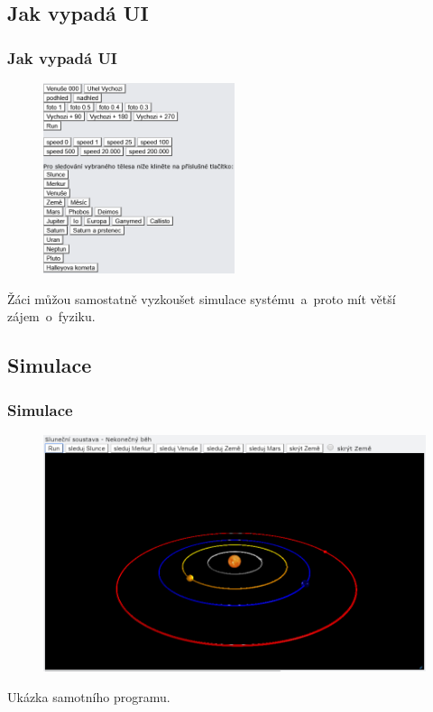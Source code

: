 \documentclass[hyperref={unicode}]{beamer}
\begin{document}
\subsection{Jak vypadá UI}
\begin{frame}
    \frametitle{Jak vypadá UI}
    \begin{figure}
        \centering
        \includegraphics[width=0.5\textwidth]{img4.png}
    \end{figure}
    
    Žáci můžou samostatně vyzkoušet simulace systému~a~proto mít větší zájem~o~fyziku.
\end{frame}

\subsection{Simulace}
\begin{frame}
    \frametitle{Simulace}
    \begin{figure}
        \centering
        \includegraphics[width=\textwidth]{img3.png}
    \end{figure}
    Ukázka samotního programu.
\end{frame}
\end{document}
